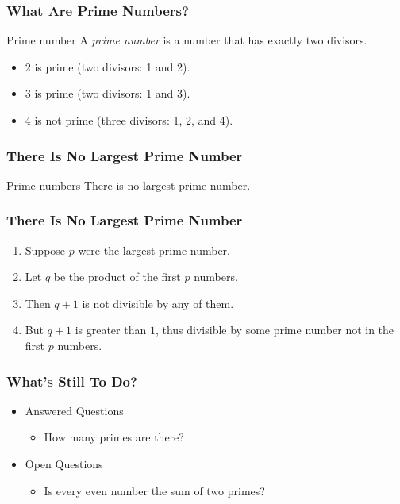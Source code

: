 \documentclass{ctexbeamer}
\begin{document}
\begin{frame}[allowframebreaks]
  \frametitle{What Are Prime Numbers?}
  \begin{Definition}{Prime number}
    A \emph{prime number} is a number that has exactly two divisors.
  \end{Definition}
  \framebreak
  \begin{Example}
    \begin{itemize}
      \item 2 is prime (two divisors: 1 and 2).
      \item 3 is prime (two divisors: 1 and 3).
      \item 4 is not prime (\alert{three} divisors: 1, 2, and 4).
    \end{itemize}
  \end{Example}
\end{frame}

\begin{frame}[fragile]
  \frametitle{There Is No Largest Prime Number}%
  \begin{Theorem}{Prime numbers}
    There is no largest prime number.
  \end{Theorem}
\end{frame}

\begin{frame}[fragile]
  \frametitle{There Is No Largest Prime Number}%
  \begin{Proof}
    \begin{enumerate}
      \item<1-> Suppose $p$ were the largest prime number.
      \item<2-> Let $q$ be the product of the first $p$ numbers.
      \item<3-> Then $q + 1$ is not divisible by any of them.
      \item<4-> But $q + 1$ is greater than $1$, thus divisible by some prime number not in the first $p$ numbers.\qedhere
    \end{enumerate}
  \end{Proof}
\end{frame}

\begin{frame}[t]
  \frametitle{What's Still To Do?}
  \begin{itemize}
    \item Answered Questions
    \begin{itemize}
      \item How many primes are there?
    \end{itemize}
    \item Open Questions
    \begin{itemize}
      \item Is every even number the sum of two primes?
    \end{itemize}
  \end{itemize}
\end{frame}
\end{document}
